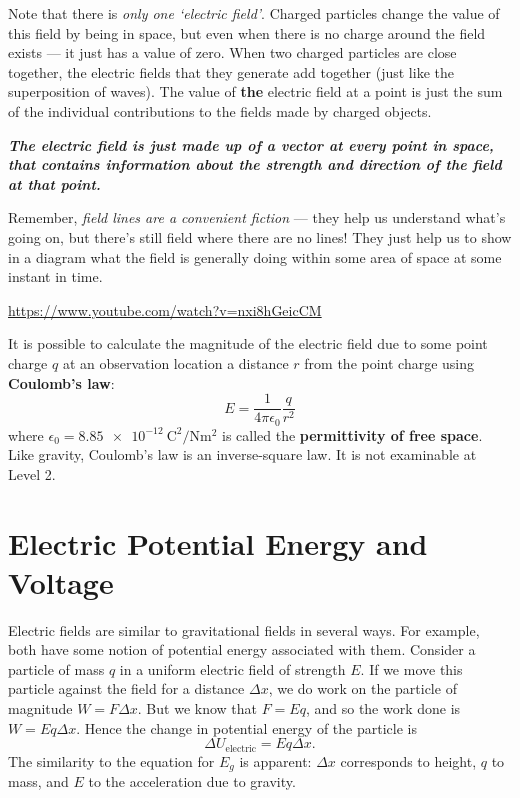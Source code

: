 \documentclass[a4paper]{amsbook}
\begin{document}
Note that there is \textit{only one `electric field'}. Charged particles change the value of this field by being in space, but even when
there is no charge around the field exists --- it just has a value of zero. When two charged particles are close together, the electric
fields that they generate add together (just like the superposition of waves). The value of \textbf{the} electric field at a point is just
the sum of the individual contributions to the fields made by charged objects.

\textbf{\textit{The electric field is just made up of a vector at every point in space, that contains information about the strength and
direction of the field at that point.}}

Remember, \textit{field lines are a convenient fiction} --- they help us understand what's going on, but there's still field where there are
no lines! They just help us to show in a diagram what the field is generally doing within some area of space at some instant in time.

\begin{center}
\begin{tcolorbox}[width=0.8\textwidth,colback={red},title={\textbf{Go and watch...}},colbacktitle=yellow,coltitle=blue]
  \textcolor{white}{\url{https://www.youtube.com/watch?v=nxi8hGeicCM}}
\end{tcolorbox}
\end{center}

It is possible to calculate the magnitude of the electric field due to some point charge $ q $ at an observation location a distance $ r $
from the point charge using \textbf{Coulomb's law}:
\begin{equation}
  E = \frac{1}{4\pi \epsilon_0} \frac{q}{r^2}
\end{equation}
where $ \epsilon_0 = \SI{8.85e-12}{\coulomb\squared\per\newton\metre\squared} $ is called the \textbf{permittivity of free space}.
Like gravity, Coulomb's law is an inverse-square law. It is not examinable at Level 2.

\section{Electric Potential Energy and Voltage}
Electric fields are similar to gravitational fields in several ways. For example, both have some notion of potential energy associated
with them. Consider a particle of mass $ q $ in a uniform electric field of strength $ E $. If we move this particle against the field
for a distance $ \Delta x $, we do work on the particle of magnitude $ W = F \Delta x $.  But we know that $ F = Eq $, and so the work
done is $ W = Eq \Delta x $. Hence the change in potential energy of the particle is
\begin{equation}
  \Delta U_{\text{electric}} = E q \Delta x.
\end{equation}
The similarity to the equation for $ E_g $ is apparent: $ \Delta x $ corresponds to height, $ q $ to mass, and $ E $ to the acceleration
due to gravity.
\end{document}
